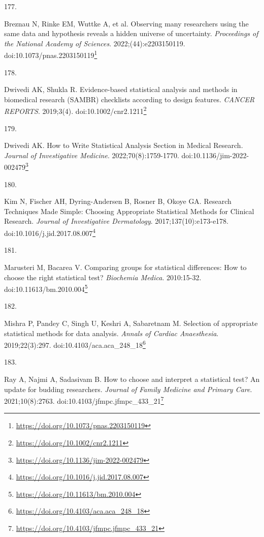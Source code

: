 \documentclass[
  a4paper,
]{book}
\newlength{\cslhangindent}
\newlength{\csllabelwidth}
\newlength{\cslentryspacingunit} %
\newenvironment{CSLReferences}[2] %
 {%
  \setlength{\parindent}{0pt}
  \ifodd #1
  \let\oldpar\par
  \def\par{\hangindent=\cslhangindent\oldpar}
  \fi
  \setlength{\parskip}{#2\cslentryspacingunit}
 }%
 {}
\newcommand{\CSLLeftMargin}[1]{\parbox[t]{\csllabelwidth}{#1}}
\newcommand{\CSLRightInline}[1]{\parbox[t]{\linewidth - \csllabelwidth}{#1}\break}
\renewcommand{\href}[2]{#2\footnote{\url{#1}}}
\begin{document}
\begin{CSLReferences}{0}{0}
\leavevmode{}%
\CSLLeftMargin{177. }%
\CSLRightInline{Breznau N, Rinke EM, Wuttke A, et al. Observing many researchers using the same data and hypothesis reveals a hidden universe of uncertainty. \emph{Proceedings of the National Academy of Sciences}. 2022;(44):e2203150119. doi:\href{https://doi.org/10.1073/pnas.2203150119}{10.1073/pnas.2203150119}}

\leavevmode{}%
\CSLLeftMargin{178. }%
\CSLRightInline{Dwivedi AK, Shukla R. Evidence{-}based statistical analysis and methods in biomedical research (SAMBR) checklists according to design features. \emph{CANCER REPORTS}. 2019;3(4). doi:\href{https://doi.org/10.1002/cnr2.1211}{10.1002/cnr2.1211}}

\leavevmode{}%
\CSLLeftMargin{179. }%
\CSLRightInline{Dwivedi AK. How to Write Statistical Analysis Section in Medical Research. \emph{Journal of Investigative Medicine}. 2022;70(8):1759-1770. doi:\href{https://doi.org/10.1136/jim-2022-002479}{10.1136/jim-2022-002479}}

\leavevmode{}%
\CSLLeftMargin{180. }%
\CSLRightInline{Kim N, Fischer AH, Dyring-Andersen B, Rosner B, Okoye GA. Research Techniques Made Simple: Choosing Appropriate Statistical Methods for Clinical Research. \emph{Journal of Investigative Dermatology}. 2017;137(10):e173-e178. doi:\href{https://doi.org/10.1016/j.jid.2017.08.007}{10.1016/j.jid.2017.08.007}}

\leavevmode{}%
\CSLLeftMargin{181. }%
\CSLRightInline{Marusteri M, Bacarea V. Comparing groups for statistical differences: How to choose the right statistical test? \emph{Biochemia Medica}. 2010:15-32. doi:\href{https://doi.org/10.11613/bm.2010.004}{10.11613/bm.2010.004}}

\leavevmode{}%
\CSLLeftMargin{182. }%
\CSLRightInline{Mishra P, Pandey C, Singh U, Keshri A, Sabaretnam M. Selection of appropriate statistical methods for data analysis. \emph{Annals of Cardiac Anaesthesia}. 2019;22(3):297. doi:\href{https://doi.org/10.4103/aca.aca_248_18}{10.4103/aca.aca\_248\_18}}

\leavevmode{}%
\CSLLeftMargin{183. }%
\CSLRightInline{Ray A, Najmi A, Sadasivam B. How to choose and interpret a statistical test? An update for budding researchers. \emph{Journal of Family Medicine and Primary Care}. 2021;10(8):2763. doi:\href{https://doi.org/10.4103/jfmpc.jfmpc_433_21}{10.4103/jfmpc.jfmpc\_433\_21}}


\end{CSLReferences}
\end{document}

